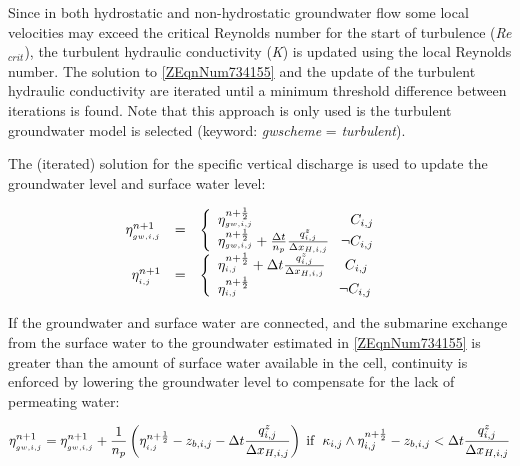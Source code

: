 \documentclass{article}
\begin{document}
\noindent 

\noindent Since in both hydrostatic and non-hydrostatic groundwater flow some local velocities may exceed the critical Reynolds number for the start of turbulence (\textit{Re${}_{crit}$}), the turbulent hydraulic conductivity (\textit{K}) is updated using the local Reynolds number. The solution to \eqref{ZEqnNum734155} and the update of the turbulent hydraulic conductivity are iterated until a minimum threshold difference between iterations is found. Note that this approach is only used is the turbulent groundwater model is selected (keyword: \textit{gwscheme} = \textit{turbulent}).

\noindent 

\noindent The (iterated) solution for the specific vertical discharge is used to update the groundwater level and surface water level:

\noindent 
\begin{equation} \label{6.11)} 
\begin{array}{rcl} {\eta _{_{gw,i,j} }^{n+1} } & {=} & {\left\{\begin{array}{l} {\eta _{_{gw,i,j} }^{n+\frac{1}{2} } {\rm \; \; \; \; \; \; \; \; \; \; \; \; \; \; \; \; \; \; \; \; \; \; \; \; \; }C_{i,j} } \\ {\eta _{_{gw,i,j} }^{n+\frac{1}{2} } +\frac{\Delta t}{n_{p} } \frac{q_{i,j}^{z} }{\Delta x_{H,i,j} } {\rm \; \; \; }\neg C_{i,j} {\rm \; \; \; }} \end{array}\right. } \\ {\eta _{_{i,j} }^{n+1} } & {=} & {\left\{\begin{array}{l} {\eta _{_{i,j} }^{n+\frac{1}{2} } +\Delta t\frac{q_{i,j}^{z} }{\Delta x_{H,i,j} } {\rm \; \; \; \; \; }C_{i,j} } \\ {\eta _{_{i,j} }^{n+\frac{1}{2} } {\rm \; \; \; \; \; \; \; \; \; \; \; \; \; \; \; \; \; \; \; \; \; \; \; }\neg C_{i,j} } \end{array}\right. } \end{array} 
\end{equation} 


\noindent If the groundwater and surface water are connected, and the submarine exchange from the surface water to the groundwater estimated in \eqref{ZEqnNum734155} is greater than the amount of surface water available in the cell, continuity is enforced by lowering the groundwater level to compensate for the lack of permeating water:

\noindent 
\begin{equation} \label{6.11)} 
\eta _{_{gw,i,j} }^{n+1} =\eta _{_{gw,i,j} }^{n+1} +\frac{1}{n_{p} } \left(\eta _{_{i,j} }^{n+\frac{1}{2} } -z_{b,i,j} -\Delta t\frac{q_{i,j}^{z} }{\Delta x_{H,i,j} } \right){\rm \; if\; \; }\kappa _{i,j} \wedge \eta _{i,j}^{n+\frac{1}{2} } -z_{b,i,j} <\Delta t\frac{q_{i,j}^{z} }{\Delta x_{H,i,j} }  
\end{equation} 
\textbf{}
\end{document}
